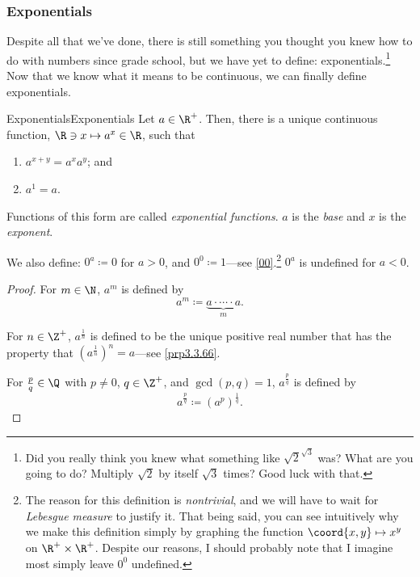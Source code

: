 \subsubsection{Exponentials}

Despite all that we've done, there is still something you thought you knew how to do with numbers since grade school, but we have yet to define:  exponentials.\footnote{Did you really think you knew what something like $\sqrt{2}^{\sqrt{3}}$ was?  What are you going to do?  Multiply $\sqrt{2}$ by itself $\sqrt{3}$ times?  Good luck with that.}  Now that we know what it means to be continuous, we can finally define exponentials.
\begin{thm}{Exponentials}{Exponentials}
Let $a\in \R ^+$.  Then, there is a unique continuous function, $\R \ni x\mapsto a^x\in \R$, such that
\begin{enumerate}
\item $a^{x+y}=a^xa^y$; and
\item $a^1=a$.
\end{enumerate}
Functions of this form are called \emph{exponential functions}.  $a$ is the \emph{base} and $x$ is the \emph{exponent}.
\begin{rmk}
We also define:  $0^a\coloneqq 0$ for $a>0$, and $0^0\coloneqq 1$---see \cref{00}.\footnote{The reason for this definition is \emph{nontrivial}, and we will have to wait for \emph{Lebesgue measure} to justify it.  That being said, you can see intuitively why we make this definition simply by graphing the function $\coord{x,y}\mapsto x^y$ on $\R ^+\times \R ^+$.  Despite our reasons, I should probably note that I imagine most simply leave $0^0$ undefined.}  $0^a$ is undefined for $a<0$.
\end{rmk}
\begin{proof}
For $m\in \N$, $a^m$ is defined by
\begin{equation}
a^m\coloneqq \underbrace{a\cdot \cdots \cdot a}_m.
\end{equation}

For $n\in \Z ^+$, $a^{\frac{1}{n}}$ is defined to be the unique positive real number that has the property that $(a^{\frac{1}{n}})^n=a$---see \cref{prp3.3.66}.

For $\frac{p}{q}\in \Q$ with $p\neq 0$, $q\in \Z ^+$, and $\gcd (p,q)=1$, $a^{\frac{p}{q}}$ is defined by
\begin{equation}
a^{\frac{p}{q}}\coloneqq (a^p)^{\tfrac{1}{q}}.
\end{equation}


\end{proof}
\end{thm}
